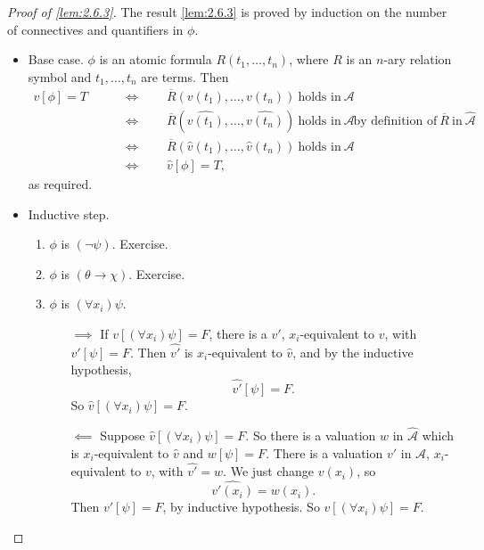 \documentclass{article}
\newcommand{\A}{\mathcal{A}}
\newcommand{\rb}[1]{\left( #1 \right)}
\renewcommand{\sb}[1]{\left[ #1 \right]}
\newcommand{\notb}[1]{\rb{\neg #1}}
\newcommand{\impb}[2]{\rb{#1 \rightarrow #2}}
\newcommand{\fab}[1]{\rb{\forall #1}}
\theoremstyle{definition}\newtheorem{definition}{Definition}[subsection]
\theoremstyle{definition}\newtheorem{remark1}[definition]{Remark}
\theoremstyle{definition}\newtheorem{example1}[definition]{Example}
\theoremstyle{definition}\newtheorem*{remark2}{Remark}
\theoremstyle{definition}\newtheorem*{example2}{Example}
\theoremstyle{definition}\newtheorem*{note}{Note}
\theoremstyle{definition}\newtheorem*{notation}{Notation}
\begin{document}
\begin{proof}[Proof of \ref{lem:2.6.3}]
The result \ref{lem:2.6.3} is proved by induction on the number of connectives and quantifiers in $ \phi $.
\begin{itemize}
\item Base case. $ \phi $ is an atomic formula $ R\rb{t_1, \dots, t_n} $, where $ R $ is an $ n $-ary relation symbol and $ t_1, \dots, t_n $ are terms. Then
\begin{align*}
v\sb{\phi} = T \qquad
& \iff \qquad \overline{R}\rb{v\rb{t_1}, \dots, v\rb{t_n}} \ \text{holds in} \ \A \\
& \iff \qquad \overline{R}\rb{\widehat{v\rb{t_1}}, \dots, \widehat{v\rb{t_n}}} \ \text{holds in} \ \A & \text{by definition of} \ \overline{R} \ \text{in} \ \widehat{\A} \\
& \iff \qquad \overline{R}\rb{\widehat{v}\rb{t_1}, \dots, \widehat{v}\rb{t_n}} \ \text{holds in} \ \A \\
& \iff \qquad \widehat{v}\sb{\phi} = T,
\end{align*}
as required.
\item Inductive step.
\begin{enumerate}[leftmargin=0.5in, label=Case \arabic*.]
\item $ \phi $ is $ \notb{\psi} $. Exercise.
\item $ \phi $ is $ \impb{\theta}{\chi} $. Exercise.
\item $ \phi $ is $ \fab{x_i}\psi $.
\begin{itemize}
\item[$ \implies $] If $ v\sb{\fab{x_i}\psi} = F $, there is a $ v' $, $ x_i $-equivalent to $ v $, with $ v'\sb{\psi} = F $. Then $ \widehat{v'} $ is $ x_i $-equivalent to $ \widehat{v} $, and by the inductive hypothesis,
$$ \widehat{v'}\sb{\psi} = F. $$
So $ \widehat{v}\sb{\fab{x_i}\psi} = F $.
\item[$ \impliedby $] Suppose $ \widehat{v}\sb{\fab{x_i}\psi} = F $. So there is a valuation $ w $ in $ \widehat{\A} $ which is $ x_i $-equivalent to $ \widehat{v} $ and $ w\sb{\psi} = F $. There is a valuation $ v' $ in $ \A $, $ x_i $-equivalent to $ v $, with $ \widehat{v'} = w $. We just change $ v\rb{x_i} $, so
$$ \widehat{v'\rb{x_i}} = w\rb{x_i}. $$
Then $ v'\sb{\psi} = F $, by inductive hypothesis. So $ v\sb{\fab{x_i}\psi} = F $.
\end{itemize}
\end{enumerate}
\end{itemize}
\end{proof}
\end{document}
